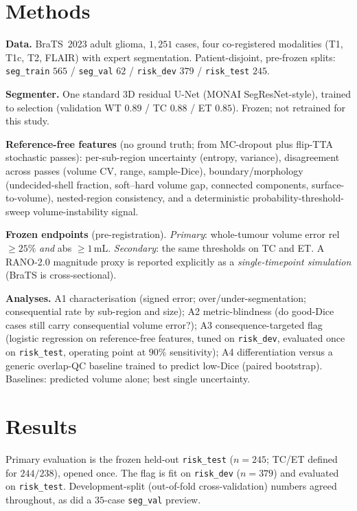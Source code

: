 \documentclass[conference]{IEEEtran}
\begin{document}
\section{Methods}
\textbf{Data.} BraTS~2023 adult glioma, $1{,}251$ cases, four co-registered
modalities (T1, T1c, T2, FLAIR) with expert segmentation. Patient-disjoint,
pre-frozen splits: \texttt{seg\_train} $565$ / \texttt{seg\_val} $62$ /
\texttt{risk\_dev} $379$ / \texttt{risk\_test} $245$.

\textbf{Segmenter.} One standard 3D residual U-Net (MONAI SegResNet-style),
trained to selection (validation WT $0.89$ / TC $0.88$ / ET $0.85$). Frozen; not
retrained for this study.

\textbf{Reference-free features} (no ground truth; from MC-dropout plus
flip-TTA stochastic passes): per-sub-region uncertainty (entropy, variance),
disagreement across passes (volume CV, range, sample-Dice), boundary/morphology
(undecided-shell fraction, soft--hard volume gap, connected components,
surface-to-volume), nested-region consistency, and a deterministic
probability-threshold-sweep volume-instability signal.

\textbf{Frozen endpoints} (pre-registration). \emph{Primary}: whole-tumour
volume error rel $\geq 25\%$ \emph{and} abs $\geq 1$\,mL. \emph{Secondary}: the
same thresholds on TC and ET. A RANO-2.0 magnitude proxy is reported explicitly
as a \emph{single-timepoint simulation} (BraTS is cross-sectional).

\textbf{Analyses.} A1 characterisation (signed error; over/under-segmentation;
consequential rate by sub-region and size); A2 metric-blindness (do good-Dice
cases still carry consequential volume error?); A3 consequence-targeted flag
(logistic regression on reference-free features, tuned on \texttt{risk\_dev},
evaluated once on \texttt{risk\_test}, operating point at $90\%$ sensitivity);
A4 differentiation versus a generic overlap-QC baseline trained to predict
low-Dice (paired bootstrap). Baselines: predicted volume alone; best single
uncertainty.

\section{Results}
Primary evaluation is the frozen held-out \texttt{risk\_test} ($n{=}245$; TC/ET
defined for $244/238$), opened once. The flag is fit on \texttt{risk\_dev}
($n{=}379$) and evaluated on \texttt{risk\_test}. Development-split
(out-of-fold cross-validation) numbers agreed throughout, as did a $35$-case
\texttt{seg\_val} preview.
\end{document}
